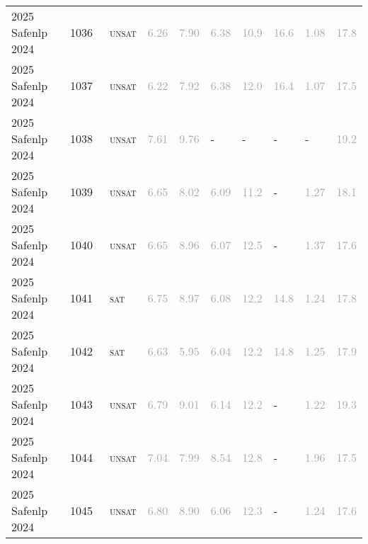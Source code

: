 \begin{center}
{\begin{longtable}{@{}llllllllll@{}}
2025 Safenlp 2024 & 1036 & ~\textsc{unsat} & \textcolor{darkgray}{6.26} & \textcolor{darkgray}{7.90} & \textcolor{darkgray}{6.38} & \textcolor{darkgray}{10.9} & \textcolor{darkgray}{16.6} & \textcolor{darkgray}{1.08} & \textcolor{darkgray}{17.8} \\
2025 Safenlp 2024 & 1037 & ~\textsc{unsat} & \textcolor{darkgray}{6.22} & \textcolor{darkgray}{7.92} & \textcolor{darkgray}{6.38} & \textcolor{darkgray}{12.0} & \textcolor{darkgray}{16.4} & \textcolor{darkgray}{1.07} & \textcolor{darkgray}{17.5} \\
2025 Safenlp 2024 & 1038 & ~\textsc{unsat} & \textcolor{darkgray}{7.61} & \textcolor{darkgray}{9.76} & - & - & - & - & \textcolor{darkgray}{19.2} \\
2025 Safenlp 2024 & 1039 & ~\textsc{unsat} & \textcolor{darkgray}{6.65} & \textcolor{darkgray}{8.02} & \textcolor{darkgray}{6.09} & \textcolor{darkgray}{11.2} & - & \textcolor{darkgray}{1.27} & \textcolor{darkgray}{18.1} \\
2025 Safenlp 2024 & 1040 & ~\textsc{unsat} & \textcolor{darkgray}{6.65} & \textcolor{darkgray}{8.96} & \textcolor{darkgray}{6.07} & \textcolor{darkgray}{12.5} & - & \textcolor{darkgray}{1.37} & \textcolor{darkgray}{17.6} \\
2025 Safenlp 2024 & 1041 & ~\textsc{sat} & \textcolor{darkgray}{6.75} & \textcolor{darkgray}{8.97} & \textcolor{darkgray}{6.08} & \textcolor{darkgray}{12.2} & \textcolor{darkgray}{14.8} & \textcolor{darkgray}{1.24} & \textcolor{darkgray}{17.8} \\
2025 Safenlp 2024 & 1042 & ~\textsc{sat} & \textcolor{darkgray}{6.63} & \textcolor{darkgray}{5.95} & \textcolor{darkgray}{6.04} & \textcolor{darkgray}{12.2} & \textcolor{darkgray}{14.8} & \textcolor{darkgray}{1.25} & \textcolor{darkgray}{17.9} \\
2025 Safenlp 2024 & 1043 & ~\textsc{unsat} & \textcolor{darkgray}{6.79} & \textcolor{darkgray}{9.01} & \textcolor{darkgray}{6.14} & \textcolor{darkgray}{12.2} & - & \textcolor{darkgray}{1.22} & \textcolor{darkgray}{19.3} \\
2025 Safenlp 2024 & 1044 & ~\textsc{unsat} & \textcolor{darkgray}{7.04} & \textcolor{darkgray}{7.99} & \textcolor{darkgray}{8.54} & \textcolor{darkgray}{12.8} & - & \textcolor{darkgray}{1.96} & \textcolor{darkgray}{17.5} \\
2025 Safenlp 2024 & 1045 & ~\textsc{unsat} & \textcolor{darkgray}{6.80} & \textcolor{darkgray}{8.90} & \textcolor{darkgray}{6.06} & \textcolor{darkgray}{12.3} & - & \textcolor{darkgray}{1.24} & \textcolor{darkgray}{17.6} \\

\end{longtable}}
\end{center}
